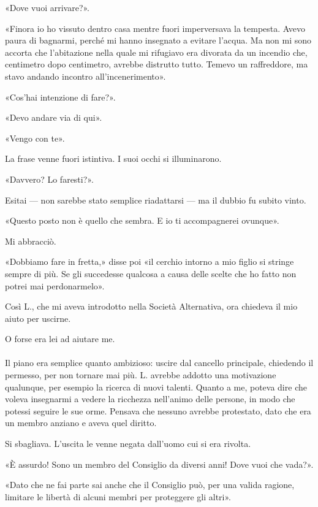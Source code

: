 \documentclass[a4paper,12pt]{book}
\begin{document}
«Dove vuoi arrivare?».

«Finora io ho vissuto dentro casa mentre fuori imperversava la tempesta. Avevo
paura di bagnarmi, perché mi hanno insegnato a evitare l'acqua. Ma non mi sono
accorta che l'abitazione nella quale mi rifugiavo era divorata da un incendio
che, centimetro dopo centimetro, avrebbe distrutto tutto. Temevo un raffreddore,
ma stavo andando incontro all'incenerimento».

«Cos'hai intenzione di fare?».

«Devo andare via di qui».

«Vengo con te».

La frase venne fuori istintiva. I suoi occhi si illuminarono.

«Davvero? Lo faresti?».

Esitai --- non sarebbe stato semplice riadattarsi --- ma il dubbio fu subito
vinto.

«Questo posto non è quello che sembra. E io ti accompagnerei ovunque».

Mi abbracciò.

«Dobbiamo fare in fretta,» disse poi «il cerchio intorno a mio figlio si stringe
sempre di più. Se gli succedesse qualcosa a causa delle scelte che ho fatto non
potrei mai perdonarmelo».

Così L., che mi aveva introdotto nella Società Alternativa, ora chiedeva il mio
aiuto per uscirne.

O forse era lei ad aiutare me.

\paragraph{}
Il piano era semplice quanto ambizioso: uscire dal cancello principale,
chiedendo il permesso, per non tornare mai più. L. avrebbe addotto una
motivazione qualunque, per esempio la ricerca di nuovi talenti. Quanto a me,
poteva dire che voleva insegnarmi a vedere la ricchezza nell'animo delle
persone, in modo che potessi seguire le sue orme. Pensava che nessuno avrebbe
protestato, dato che era un membro anziano e aveva quel diritto.

Si sbagliava. L'uscita le venne negata dall'uomo cui si era rivolta.

«È assurdo! Sono un membro del Consiglio da diversi anni! Dove vuoi che vada?».

«Dato che ne fai parte sai anche che il Consiglio può, per una valida ragione,
limitare le libertà di alcuni membri per proteggere gli altri».
\end{document}
